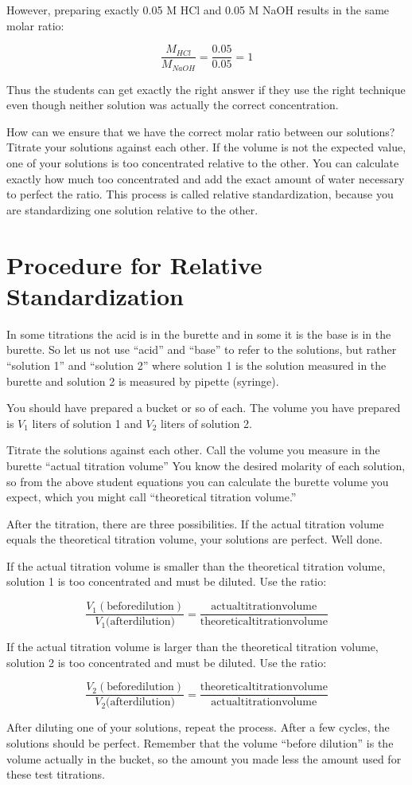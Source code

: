 However, preparing exactly 0.05 M HCl and 0.05 M NaOH results in the same molar ratio:

\[ \frac{M_{HCl}}{M_{NaOH}} = \frac{0.05}{0.05} = 1 \]

Thus the students can get exactly the right answer if they use the right technique even though neither solution was actually the correct concentration.

How can we ensure that we have the correct molar ratio between our solutions? Titrate your solutions against each other. If the volume is not the expected value, one of your solutions is too concentrated relative to the other. You can calculate exactly how much too concentrated and add the exact amount of water necessary to perfect the ratio. This process is called relative standardization, because you are standardizing one solution relative to the other.

\section{Procedure for Relative Standardization}

In some titrations the acid is in the burette and in some it is the base is in the burette. So let us not use “acid” and “base” to refer to the solutions, but rather “solution 1” and “solution 2” where solution 1 is the solution measured in the burette and solution 2 is measured by pipette (syringe).

You should have prepared a bucket or so of each. The volume you have prepared is $ V_1 $ liters of solution 1 and $ V_2 $ liters of solution 2.

Titrate the solutions against each other. Call the volume you measure in the burette “actual titration volume” You know the desired molarity of each solution, so from the above student equations you can calculate the burette volume you expect, which you might call “theoretical titration volume.”

After the titration, there are three possibilities. If the actual titration volume equals the theoretical titration volume, your solutions are perfect. Well done.

If the actual titration volume is smaller than the theoretical titration volume, solution 1 is too concentrated and must be diluted. Use the ratio:

\[ \frac{V_1 \mathrm{(before dilution)}}{V_1 (\mathrm{after dilution)}} = \frac{\mathrm{actual titration volume}}{\mathrm{theoretical titration volume}} \]

If the actual titration volume is larger than the theoretical titration volume, solution 2 is too concentrated and must be diluted. Use the ratio:

\[ \frac{V_2 \mathrm{(before dilution)}}{V_2 (\mathrm{after dilution)}} = \frac{\mathrm{theoretical titration volume}}{\mathrm{actual titration volume}} \]

After diluting one of your solutions, repeat the process. After a few cycles, the solutions should be perfect. Remember that the volume “before dilution” is the volume actually in the bucket, so the amount you made less the amount used for these test titrations.
